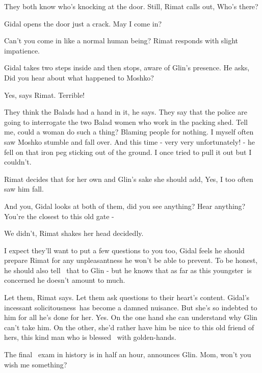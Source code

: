 \documentclass[letterpaper]{article}
\begin{document}
They both know who's knocking at the door. Still, Rimat calls out, {\textquotedbl}Who's there?{\textquotedbl}

Gidal opens the door just a crack. {\textquotedbl}May I come in?{\textquotedbl} 

{\textquotedbl}Can't you come in like a normal human being?{\textquotedbl} Rimat responds with slight
impatience{. \ }

Gidal takes two steps inside and then stops, aware of Glin's presence. He asks, {\textquotedbl}Did you hear about what
happened to Moshko?{\textquotedbl}

{\textquotedbl}Yes,{\textquotedbl} says Rimat. {\textquotedbl}Terrible!{\textquotedbl} 

{\textquotedbl}They think the Balads had a hand in it,{\textquotedbl} he says. {\textquotedbl}They say that the police
are going to interrogate the two Balad women who work in the packing shed. Tell me, could a woman do such a thing?
Blaming people for nothing. I myself often saw Moshko stumble and fall over. And this time - very very unfortunately! -
he fell on that iron peg sticking out of the ground. I once tried to pull it out but I couldn't.{\textquotedbl} 

Rimat decides that for her own and Glin's sake she should add, {\textquotedbl}Yes, I too often saw him
fall.{\textquotedbl} 

{\textquotedbl}And you,{\textquotedbl} Gidal looks at both of them, {\textquotedbl}did you see anything? Hear anything?
You're the closest to this old gate -{\textquotedbl} 

{\textquotedbl}We didn't,{\textquotedbl} Rimat shakes her head decidedly. 

{\textquotedbl}I expect they'll want to put a few questions to you too,{\textquotedbl} Gidal feels he should prepare
Rimat for any unpleasantness he won't be able to prevent. To be honest, he should also tell \ that to Glin - but he
knows that as far as this youngster~is concerned he doesn't amount to much. 

{\textquotedbl}Let them,{\textquotedbl} Rimat says. {\textquotedbl}Let them ask questions to their heart's
content.{\textquotedbl} Gidal's incessant solicitousness~has become a damned nuisance. But she's so indebted to him for
all he's done for her. Yes. On the one hand she can understand why Glin can't take him. On the other, she'd rather have
him be nice to this old friend of hers, this kind man who is blessed \ with golden-hands.

{\textquotedbl}The final \ exam in history is in half an hour,{\textquotedbl} announces Glin. {\textquotedbl}Mom, won't
you wish me something?{\textquotedbl} 
\end{document}
